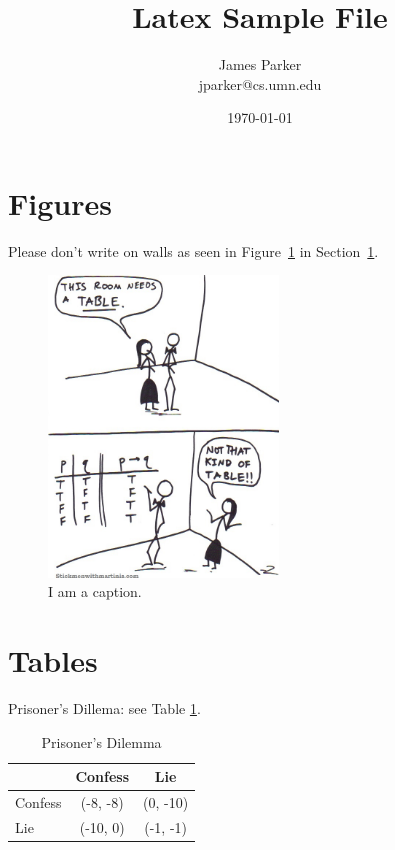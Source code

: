 \documentclass[11pt]{article}
\title{Latex Sample File}
\author{
James Parker\\jparker@cs.umn.edu
}
\date{\today}
\begin{document}
\maketitle

\section{Figures}
\label{sec:fig}

Please don't write on walls as seen in Figure~\ref{fig:tabl} in Section~\ref{sec:fig}.
   \begin{figure}[h] %
      \centering
      \includegraphics[height=80mm]{truth-table.jpg}
      \caption{I am a caption.}
      \label{fig:tabl}
   \end{figure}


\section*{Tables}

Prisoner's Dillema: see Table \ref{tab:pd}.

\begin{table}
\centering
\caption{Prisoner's Dilemma}
\begin{tabular}{| l || c | c |} %
\hline %
 & Confess & Lie \\ %
   \hline \hline
Confess & (-8, -8) & (0, -10) \\ %
\hline
Lie & (-10, 0) & (-1, -1) \\ 
\hline
   \end{tabular}
\label{tab:pd} 
\end{table}
\end{document}
